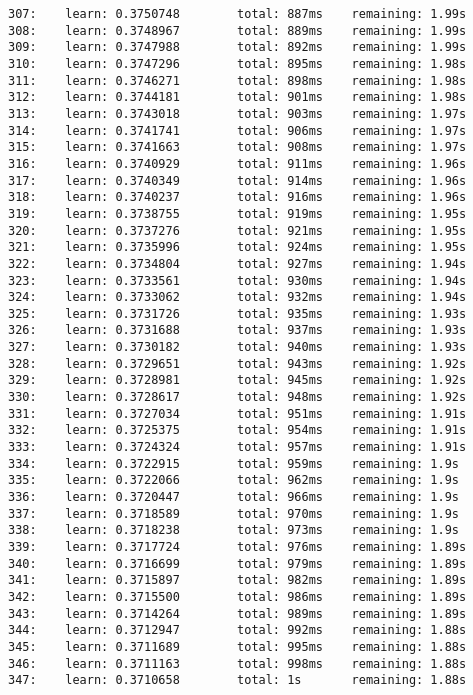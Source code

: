\documentclass[11pt]{article}
\begin{document}
\begin{Verbatim}[commandchars=\\\{\}]
307:    learn: 0.3750748        total: 887ms    remaining: 1.99s
308:    learn: 0.3748967        total: 889ms    remaining: 1.99s
309:    learn: 0.3747988        total: 892ms    remaining: 1.99s
310:    learn: 0.3747296        total: 895ms    remaining: 1.98s
311:    learn: 0.3746271        total: 898ms    remaining: 1.98s
312:    learn: 0.3744181        total: 901ms    remaining: 1.98s
313:    learn: 0.3743018        total: 903ms    remaining: 1.97s
314:    learn: 0.3741741        total: 906ms    remaining: 1.97s
315:    learn: 0.3741663        total: 908ms    remaining: 1.97s
316:    learn: 0.3740929        total: 911ms    remaining: 1.96s
317:    learn: 0.3740349        total: 914ms    remaining: 1.96s
318:    learn: 0.3740237        total: 916ms    remaining: 1.96s
319:    learn: 0.3738755        total: 919ms    remaining: 1.95s
320:    learn: 0.3737276        total: 921ms    remaining: 1.95s
321:    learn: 0.3735996        total: 924ms    remaining: 1.95s
322:    learn: 0.3734804        total: 927ms    remaining: 1.94s
323:    learn: 0.3733561        total: 930ms    remaining: 1.94s
324:    learn: 0.3733062        total: 932ms    remaining: 1.94s
325:    learn: 0.3731726        total: 935ms    remaining: 1.93s
326:    learn: 0.3731688        total: 937ms    remaining: 1.93s
327:    learn: 0.3730182        total: 940ms    remaining: 1.93s
328:    learn: 0.3729651        total: 943ms    remaining: 1.92s
329:    learn: 0.3728981        total: 945ms    remaining: 1.92s
330:    learn: 0.3728617        total: 948ms    remaining: 1.92s
331:    learn: 0.3727034        total: 951ms    remaining: 1.91s
332:    learn: 0.3725375        total: 954ms    remaining: 1.91s
333:    learn: 0.3724324        total: 957ms    remaining: 1.91s
334:    learn: 0.3722915        total: 959ms    remaining: 1.9s
335:    learn: 0.3722066        total: 962ms    remaining: 1.9s
336:    learn: 0.3720447        total: 966ms    remaining: 1.9s
337:    learn: 0.3718589        total: 970ms    remaining: 1.9s
338:    learn: 0.3718238        total: 973ms    remaining: 1.9s
339:    learn: 0.3717724        total: 976ms    remaining: 1.89s
340:    learn: 0.3716699        total: 979ms    remaining: 1.89s
341:    learn: 0.3715897        total: 982ms    remaining: 1.89s
342:    learn: 0.3715500        total: 986ms    remaining: 1.89s
343:    learn: 0.3714264        total: 989ms    remaining: 1.89s
344:    learn: 0.3712947        total: 992ms    remaining: 1.88s
345:    learn: 0.3711689        total: 995ms    remaining: 1.88s
346:    learn: 0.3711163        total: 998ms    remaining: 1.88s
347:    learn: 0.3710658        total: 1s       remaining: 1.88s

\end{Verbatim}
\end{document}

